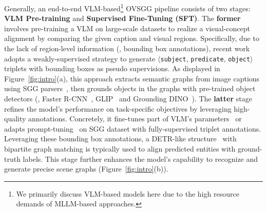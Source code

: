 Generally, an end-to-end VLM-based\footnote{We primarily discuss VLM-based models here due to the high resource demands of MLLM-based approaches.} OVSGG pipeline consists of two stages: \textbf{VLM Pre-training} and \textbf{Supervised Fine-Tuning (SFT)}. The \textbf{former} involves pre-training a VLM on large-scale datasets to realize a visual-concept alignment by comparing the given caption and visual regions. Specifically, due to the lack of region-level information (\eg, bounding box annotations), recent work~\cite{he2022towards, zhang2023learning, chen2024expanding} adopts a weakly-supervised strategy to generate $\langle$\texttt{subject}, \texttt{predicate}, \texttt{object}$\rangle$ triplets with bounding boxes as pseudo supervisions. As displayed in Figure~\ref{fig:intro}(a), this approach extracts semantic graphs from image captions using SGG parsers~\cite{schuster2015generating}, then grounds objects in the graphs with pre-trained object detectors (\eg, Faster R-CNN~\cite{ren2015faster}, GLIP~\cite{li2022grounded} and Grounding DINO~\cite{liu2023grounding}). The \textbf{latter} stage refines the model's performance on task-specific objectives by leveraging high-quality annotations. Concretely, it fine-tunes part of VLM's parameters~\cite{chen2024expanding} or adapts prompt-tuning~\cite{he2022towards} on SGG dataset with fully-supervised triplet annotations. Leveraging these bounding box annotations, a DETR-like structure~\cite{carion2020end} with bipartite graph matching is typically used to align predicted entities with ground-truth labels. This stage further enhances the model's capability to recognize and generate precise scene graphs (\cf Figure~\ref{fig:intro}(b)).

